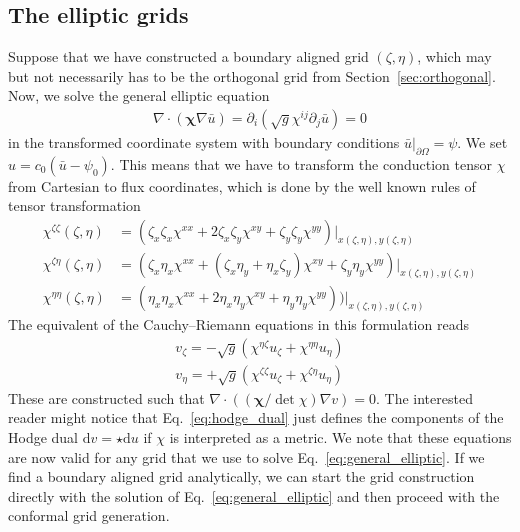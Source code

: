 \documentclass{hitec} %
\renewcommand{\d}{\mathrm{d}}
\renewcommand{\vec}[1]{{\mathbf{#1}}}
\begin{document}
\subsection{The elliptic grids} \label{sec:elliptic}
Suppose that we have constructed a boundary aligned grid $(\zeta,\eta)$, which
may but not necessarily has to be the orthogonal grid from Section~\ref{sec:orthogonal}. 
Now, we solve the general elliptic equation
\begin{align}
 \nabla\cdot(\vec \chi \nabla \bar u) = \partial_i(\sqrt{g} \chi^{ij}\partial_j \bar u) = 0
  \label{eq:general_elliptic}
\end{align}
in the transformed coordinate system with boundary conditions $\bar u|_{\partial\Omega}=\psi$. We set $u=c_0(\bar u -\psi_0)$. This means that we have to 
transform the conduction tensor $\chi$ from Cartesian to flux coordinates,
which is done by the well known rules of tensor transformation
\begin{subequations}
\begin{align}
  \chi^{\zeta\zeta}(\zeta, \eta) &= (\zeta_x\zeta_x \chi^{xx} + 2\zeta_x\zeta_y\chi^{xy} + \zeta_y\zeta_y \chi^{yy})|_{x(\zeta,\eta), y(\zeta,\eta)}\\
  \chi^{\zeta\eta}(\zeta, \eta) &= (\zeta_x\eta_x \chi^{xx} + (\zeta_x\eta_y + \eta_x\zeta_y)\chi^{xy} + \zeta_y\eta_y \chi^{yy})|_{x(\zeta,\eta), y(\zeta,\eta)}\\
  \chi^{\eta\eta} (\zeta, \eta) &= (\eta_x\eta_x \chi^{xx} + 2\eta_x\eta_y\chi^{xy} + \eta_y\eta_y \chi^{yy}))|_{x(\zeta,\eta), y(\zeta,\eta)}
\end{align}
\label{eq:transformationChi}
\end{subequations}
The equivalent of the Cauchy--Riemann equations in this formulation reads
\begin{subequations}
\begin{align}
  v_\zeta = -\sqrt{g}(\chi^{\eta\zeta}u_\zeta + \chi^{\eta\eta}u_\eta)\\
  v_\eta = +\sqrt{g}(\chi^{\zeta\zeta}u_\zeta + \chi^{\zeta\eta}u_\eta)
\end{align}
  \label{eq:hodge_dual}
\end{subequations}
These are constructed such that
 $\nabla\cdot((\vec \chi/ \det \chi) \nabla v) = 0$.
The interested reader might notice that Eq.~\eqref{eq:hodge_dual} just 
defines the components of the Hodge dual $\d v = \star\d u$  
if $\chi$  is interpreted as a metric.
We note that these equations are now valid for any grid that  
we use to solve Eq.~\eqref{eq:general_elliptic}. If we find a boundary
aligned grid analytically, we can start the grid construction 
directly with the solution of Eq.~\eqref{eq:general_elliptic} 
and then proceed with the conformal grid generation. 
\end{document}

